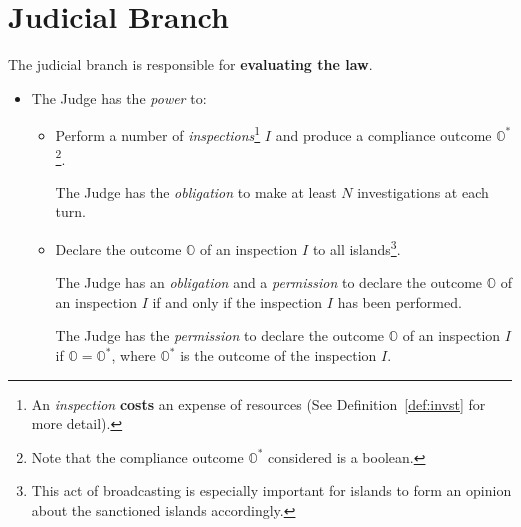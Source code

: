 \section{Judicial Branch}
\label{sec:judicial}

The judicial branch is responsible for \textbf{evaluating the law}.
\begin{itemize}
    \item The Judge has the \emph{power} to:
    \begin{itemize}
        \item Perform a number of \emph{inspections}\footnote{An \emph{inspection} \textbf{costs} an expense of resources (See Definition~\ref{def:invst} for more detail).} $I$ and produce a compliance outcome $\mathbb{O}^{*}$\footnote{Note that the compliance outcome $\mathbb{O}^{*}$ considered is a boolean.}.
        \begin{rule_IIGO}
            The Judge has the \emph{obligation} to make at least $N$ investigations at each turn.
        \end{rule_IIGO}
        \item Declare the outcome $\mathbb{O}$ of an inspection $I$ to all islands\footnote{This act of broadcasting is especially important for islands to form an opinion about the sanctioned islands accordingly.}.
        \begin{rule_IIGO}
            The Judge has an \emph{obligation} and a \emph{permission} to declare the outcome $\mathbb{O}$ of an inspection $I$ if and only if the inspection $I$ has been performed.
        \end{rule_IIGO}
        \begin{rule_IIGO}
            The Judge has the \emph{permission} to declare the outcome $\mathbb{O}$ of an inspection $I$ if $\mathbb{O} = \mathbb{O}^{*}$, where $\mathbb{O}^{*}$ is the outcome of the inspection $I$.
        \end{rule_IIGO}

\end{itemize}
\end{itemize}

